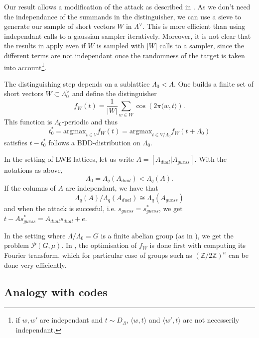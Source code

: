 \documentclass{article}
\begin{document}
Our result allows a modification of the attack as described in \cite{pouly2023provable}. As we don't need the independance of the summands in the distinguisher, we can use a sieve to generate our sample of short vectors $W$ in $\Lambda^\vee$. This is more efficient than using independant calls to a gaussian sampler iteratively. Moreover, it is not clear that the results in \cite{pouly2023provable} apply even if $W$ is sampled with $|W|$ calls to a sampler, since the different terms are not independant once the randomness of the target is taken into account\footnote{if $w,w'$ are independant and $t\sim D_\Lambda$, $\langle w , t \rangle $ and $\langle w' , t \rangle $ are not necesserily independant.}.   
 
The distinguishing step depends on a sublattice $\Lambda_0 < \Lambda$. One builds a finite set of short vectors $W\subset \Lambda_0^\vee$ and define the distinguisher
$$f_W(t) = \frac{1}{|W|} \sum_{w\in W} \cos (2\pi \langle w, t\rangle ).$$ 
This function is $\Lambda_0$-periodic and thus 
$$ t_0^* = \text{argmax}_{t\in V} f_W(t) = \text{argmax}_{t\in V/\Lambda_0} f_W(t+ \Lambda_0) $$
satisfies $t - t_0^*$ follows a BDD-distribution on $\Lambda_0$.

In the setting of LWE lattices, let us write $A  = [A_{dual} | A_{guess} ]$. With the notations as above, 
$$\Lambda_0 = \Lambda_{q}(A_{dual}) < \Lambda_q(A).$$ 
If the columns of $A$ are independant, we have that 
$$\Lambda_{q}(A) / \Lambda_{q}(A_{dual}) \cong \Lambda_{q}(A_{guess})$$ 
and when the attack is succesful, i.e. $s_{guess} = s_{guess}^*$, we get $t-As_{guess}^* = A_{dual}s_{dual} + e$.

In the setting where $\Lambda / \Lambda_0 = G$ is a finite abelian group (as in \cite{ducas2023does}), we get the problem $\mathcal P(G,\mu)$. In \cite{ducas2023does}, the optimisation of $f_W$ is done first with computing its Fourier transform, which for particular case of groups such as $(\mathbb Z / 2 \mathbb Z)^n$ can be done very efficiently. 

\subsection{Analogy with codes} %
\end{document}
